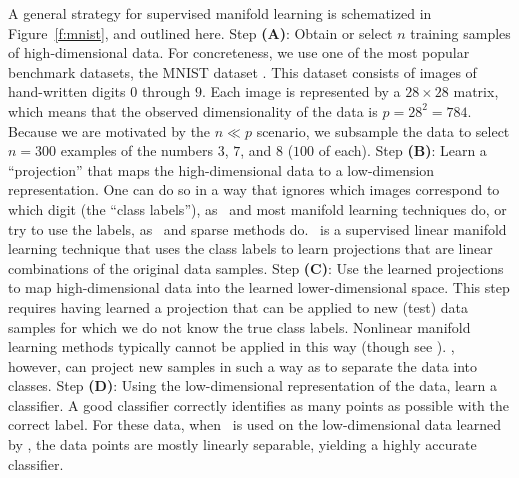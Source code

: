 \documentclass[11pt]{extarticle}
\begin{document}
A general strategy for supervised manifold learning is schematized in Figure~\ref{f:mnist}, and outlined here.
Step \textbf{(A)}: Obtain or select $n$ training samples of high-dimensional data.  For concreteness, we use one of the most popular benchmark datasets, the MNIST dataset \cite{mnist}.  This dataset consists of  images of hand-written digits $0$ through $9$.  Each image is represented by a $28\times28$ matrix, which means that the observed  dimensionality of the data is $p=28^2=784$.  Because we are motivated by the $n \ll p$ scenario, we subsample the data to select $n=300$ examples of the numbers $3$, $7$, and $8$ ($100$ of each).
%
Step \textbf{(B)}: Learn a ``projection'' that maps the high-dimensional data to a low-dimension representation.  One can do so in a way that ignores which images correspond to which digit (the ``class labels''), as \Pca~and most manifold learning techniques do, or try to use the labels, as \Lda~and sparse methods do.
 \Lol~is a supervised linear manifold learning technique that  uses the class labels to learn projections that are linear combinations of the original data samples. %
%
Step \textbf{(C)}: Use the learned projections to map  high-dimensional data into the learned lower-dimensional space. This step requires having learned a projection that can be applied to new (test) data samples for which we do not know the true class labels.  Nonlinear manifold learning methods typically cannot be applied in this way (though see \cite{Bengio2004}).  \Lol, however, can project new samples in such a way as to separate the data into classes.
Step \textbf{(D)}: Using the low-dimensional representation of the data, learn a classifier.  A good classifier correctly identifies as many points as possible with the correct label.  %
For these data, when  \Lda~is used on the low-dimensional data learned by \Lol, the data points are mostly linearly separable, yielding a highly accurate classifier.
\end{document}
